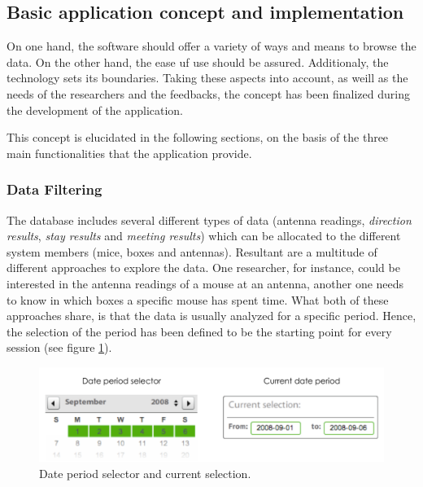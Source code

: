 \subsection{Basic application concept and implementation}
\label{subsec:app_concept}

On one hand, the software should offer a variety of ways and means to browse the data. On the other hand, the ease uf use should be assured. Additionaly, the technology sets its boundaries. Taking these aspects into account, as weill as the needs of the researchers and the feedbacks, the concept has been finalized during the development of the application. 

This concept is elucidated in the following sections, on the basis of the three main functionalities that the application provide. 
   
\subsubsection{Data Filtering}
\label{sububsec:datafilter}

The database includes several different types of data (antenna readings, \textit{direction results}, \textit{stay results} and \textit{meeting results}) which can be allocated to the different system members (mice, boxes and antennas). Resultant are a multitude of different approaches to explore the data. One researcher, for instance, could be interested in the antenna readings of a mouse at an antenna, another one needs to know in which boxes a specific mouse has spent time. What both of these approaches share, is that the data is usually analyzed for a specific period. Hence, the selection of the period has been defined to be the starting point for every session (see figure \ref{fig:date_period}).

\begin{figure}[htpb]
\begin{center}
  \includegraphics[width=.75\textwidth]{assets/pdf/date_period.pdf}
  \caption[Date period selection]{Date period selector and current selection.}
  \label{fig:date_period}
\end{center}
\end{figure}

